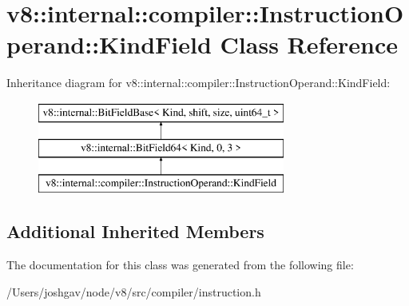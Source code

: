 \hypertarget{classv8_1_1internal_1_1compiler_1_1_instruction_operand_1_1_kind_field}{}\section{v8\+:\+:internal\+:\+:compiler\+:\+:Instruction\+Operand\+:\+:Kind\+Field Class Reference}
\label{classv8_1_1internal_1_1compiler_1_1_instruction_operand_1_1_kind_field}
Inheritance diagram for v8\+:\+:internal\+:\+:compiler\+:\+:Instruction\+Operand\+:\+:Kind\+Field\+:\begin{figure}[H]
\begin{center}
\leavevmode
\includegraphics[height=3.000000cm]{classv8_1_1internal_1_1compiler_1_1_instruction_operand_1_1_kind_field}
\end{center}
\end{figure}
\subsection*{Additional Inherited Members}


The documentation for this class was generated from the following file\+:\begin{DoxyCompactItemize}
\item 
/\+Users/joshgav/node/v8/src/compiler/instruction.\+h\end{DoxyCompactItemize}
